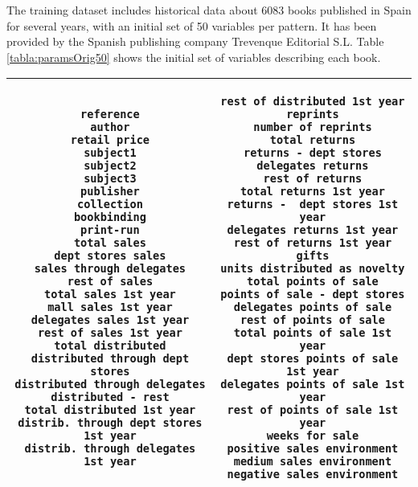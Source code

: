 \documentclass[a4paper,10pt,twocolumn,preprint,3p]{elsarticle}
\begin{document}
The training dataset includes historical data about 6083 books
published in Spain for several years, with an initial set of 50
variables per pattern. It has been provided by the Spanish publishing
company Trevenque Editorial S.L. Table 
\ref{tabla:paramsOrig50} shows the initial set of variables describing
each book. 

\begin{table*}[!ht]
\caption{Parameters describing a book, provided by the company Trevenque S.L.}
\label{tabla:paramsOrig50}
\begin{center}
\begin{tabular}{|c|c|}
\hline 

\begin{minipage}{2.45in}\begin{small}
 \begin{verbatim}
reference
author
retail price
subject1
subject2
subject3
publisher
collection
bookbinding
print-run
total sales
dept stores sales
sales through delegates
rest of sales
total sales 1st year
mall sales 1st year
delegates sales 1st year
rest of sales 1st year
total distributed
distributed through dept stores
distributed through delegates
distributed - rest
total distributed 1st year
distrib. through dept stores 1st year
distrib. through delegates 1st year
\end{verbatim}
\end{small} \end{minipage}     & 

\begin{minipage}{2.3in} \begin{small}
\begin{verbatim}
rest of distributed 1st year
reprints
number of reprints
total returns
returns - dept stores
delegates returns
rest of returns
total returns 1st year
returns -  dept stores 1st year
delegates returns 1st year
rest of returns 1st year
gifts
units distributed as novelty
total points of sale
points of sale - dept stores
delegates points of sale
rest of points of sale
total points of sale 1st year
dept stores points of sale 1st year
delegates points of sale 1st year
rest of points of sale 1st year
weeks for sale
positive sales environment
medium sales environment
negative sales environment
\end{verbatim}
\end{small} \end{minipage}    \\

\hline
\end{tabular}
\end{center}
\end{table*}
\end{document}
